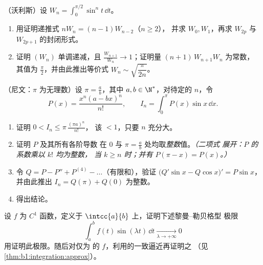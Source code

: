 \begin{exercise}[$\star\star\star$]\label{exo:b1:integration:8}
（沃利斯）设 $W_n = \int_0^{\pi/2} \sin^n t\,\dd t$。
\begin{enumerate}
  \item 用证明递推式 $n W_n = (n-1) W_{n-2}$（$n \geq 2$），
        并求 $W_0, W_1$，再求 $W_{2p}$ 与 $W_{2p+1}$
        的封闭形式。
  \item 证明 $(W_n)$ 单调递减，且 $\frac{W_{n+1}}{W_n}
        \to 1$；证明量 $(n+1)\,W_{n+1} W_n$ 为常数，
        其值为 $\frac\pi2$，并由此推出等价式
        $W_n \sim \sqrt{\dfrac{\pi}{2n}}$。
\end{enumerate}
\end{exercise}

\begin{exercise}[$\star\star\star$]\label{exo:b1:integration:9}
（尼文：$\pi$ 为无理数）设 $\pi = \frac ab$，其中 $a, b \in
\N^*$，对待定的 $n$，令
\[
P(x) = \frac{x^n (a - bx)^n}{n!},
\qquad
I_n = \int_0^{\pi} P(x)\sin x\, \dd x .
\]
\begin{enumerate}
  \item 证明 $0 < I_n \leq \pi\,\frac{(\pi a)^n}{n!}$，
        该 $< 1$，只要 $n$ 充分大。
  \item 证明 $P$ 及其所有各阶导数
        在 $0$ 与 $\pi = \frac ab$ 处均取\emph{整数}值。\emph{（二项式
        展开：$P$ 的系数乘以 $k!$ 均为整数，
        当 $k \geq n$ 时；并有 $P(\pi - x) = P(x)$。）}
  \item 令 $Q = P - P'' + P^{(4)} - \dots$（有限和），验证
        $\bigl(Q'\sin x - Q\cos x\bigr)' = P \sin x$，并由此推出
        $I_n = Q(\pi) + Q(0)$ 为整数。
  \item 得出结论。
\end{enumerate}
\end{exercise}

\begin{exercise}[$\star\star\star$]\label{exo:b1:integration:10}
设 $f$ 为 $C^1$ 函数，定义于 $\intcc{a}{b}$ 上，证明下述黎曼--勒贝格型
极限
\[
\int_a^b f(t)\sin(\lambda t)\,\dd t \xrightarrow[\lambda \to
+\infty]{} 0
\]
用证明此极限。随后对仅为
的 $f$，利用的一致逼近再证明之
（见\cref{thm:b1:integration:approx}）。
\end{exercise}

